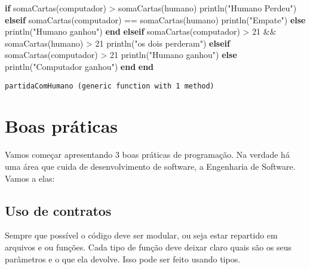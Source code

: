 \documentclass[
  letterpaper,
  DIV=11,
  numbers=noendperiod]{scrreprt}
\newenvironment{Shaded}{\begin{snugshade}}{\end{snugshade}}
\newcommand{\ControlFlowTok}[1]{\textcolor[rgb]{0.00,0.23,0.31}{\textbf{#1}}}
\newcommand{\FloatTok}[1]{\textcolor[rgb]{0.68,0.00,0.00}{#1}}
\newcommand{\FunctionTok}[1]{\textcolor[rgb]{0.28,0.35,0.67}{#1}}
\newcommand{\KeywordTok}[1]{\textcolor[rgb]{0.00,0.23,0.31}{\textbf{#1}}}
\newcommand{\NormalTok}[1]{\textcolor[rgb]{0.00,0.23,0.31}{#1}}
\newcommand{\OperatorTok}[1]{\textcolor[rgb]{0.37,0.37,0.37}{#1}}
\newcommand{\StringTok}[1]{\textcolor[rgb]{0.13,0.47,0.30}{#1}}
\begin{document}
\begin{Shaded}
\begin{Highlighting}[]
         \ControlFlowTok{if} \FunctionTok{somaCartas}\NormalTok{(computador) }\OperatorTok{\textgreater{}} \FunctionTok{somaCartas}\NormalTok{(humano)}
             \FunctionTok{println}\NormalTok{(}\StringTok{"Humano Perdeu"}\NormalTok{)}
         \ControlFlowTok{elseif} \FunctionTok{somaCartas}\NormalTok{(computador) }\OperatorTok{==} \FunctionTok{somaCartas}\NormalTok{(humano)}
             \FunctionTok{println}\NormalTok{(}\StringTok{"Empate"}\NormalTok{)}
         \ControlFlowTok{else}
             \FunctionTok{println}\NormalTok{(}\StringTok{"Humano ganhou"}\NormalTok{)}
         \ControlFlowTok{end}
    \ControlFlowTok{elseif} \FunctionTok{somaCartas}\NormalTok{(computador) }\OperatorTok{\textgreater{}} \FloatTok{21} \OperatorTok{\&\&} \FunctionTok{somaCartas}\NormalTok{(humano) }\OperatorTok{\textgreater{}} \FloatTok{21}
         \FunctionTok{println}\NormalTok{(}\StringTok{"os dois perderam"}\NormalTok{)}
    \ControlFlowTok{elseif} \FunctionTok{somaCartas}\NormalTok{(computador) }\OperatorTok{\textgreater{}} \FloatTok{21}
         \FunctionTok{println}\NormalTok{(}\StringTok{"Humano ganhou"}\NormalTok{)}
    \ControlFlowTok{else}
         \FunctionTok{println}\NormalTok{(}\StringTok{"Computador ganhou"}\NormalTok{)}
    \ControlFlowTok{end}
\KeywordTok{end}
\end{Highlighting}
\end{Shaded}

\begin{verbatim}
partidaComHumano (generic function with 1 method)
\end{verbatim}


\chapter{Boas práticas}\label{boas-pruxe1ticas}

Vamos começar apresentando 3 boas práticas de programação. Na verdade há
uma área que cuida de desenvolvimento de software, a Engenharia de
Software. Vamos a elas:

\section{Uso de contratos}\label{uso-de-contratos}

Sempre que possível o código deve ser modular, ou seja estar repartido
em arquivos e ou funções. Cada tipo de função deve deixar claro quais
são os seus parâmetros e o que ela devolve. Isso pode ser feito usando
tipos.
\end{document}
